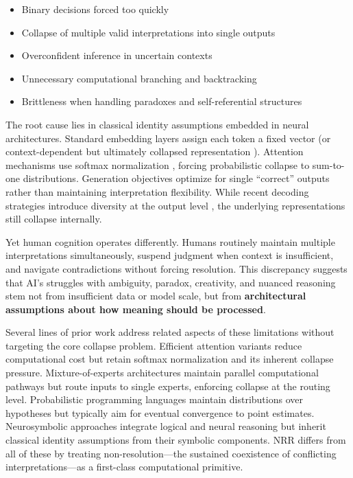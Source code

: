 \documentclass[11pt,a4paper]{article}
\begin{document}
\begin{itemize}
\item Binary decisions forced too quickly
\item Collapse of multiple valid interpretations into single outputs
\item Overconfident inference in uncertain contexts
\item Unnecessary computational branching and backtracking
\item Brittleness when handling paradoxes and self-referential structures
\end{itemize}

The root cause lies in classical identity assumptions embedded in neural architectures.
Standard embedding layers assign each token a fixed vector (or context-dependent but ultimately collapsed representation \cite{peters2018deep}).
Attention mechanisms use softmax normalization \cite{vaswani2017attention}, forcing probabilistic collapse to sum-to-one distributions.
Generation objectives optimize for single ``correct'' outputs rather than maintaining interpretation flexibility.
While recent decoding strategies introduce diversity at the output level \cite{holtzman2020curious, li2023contrastive}, the underlying representations still collapse internally.

Yet human cognition operates differently.
Humans routinely maintain multiple interpretations simultaneously, suspend judgment when context is insufficient, and navigate contradictions without forcing resolution.
This discrepancy suggests that AI's struggles with ambiguity, paradox, creativity, and nuanced reasoning stem not from insufficient data or model scale, but from \textbf{architectural assumptions about how meaning should be processed}.

Several lines of prior work address related aspects of these limitations without targeting the core collapse problem.
Efficient attention variants \cite{child2019generating, dao2022flashattention} reduce computational cost but retain softmax normalization and its inherent collapse pressure.
Mixture-of-experts architectures \cite{shazeer2017outrageously} maintain parallel computational pathways but route inputs to single experts, enforcing collapse at the routing level.
Probabilistic programming languages \cite{goodman2008church} maintain distributions over hypotheses but typically aim for eventual convergence to point estimates.
Neurosymbolic approaches \cite{garcez2020neural} integrate logical and neural reasoning but inherit classical identity assumptions from their symbolic components.
NRR differs from all of these by treating non-resolution---the sustained coexistence of conflicting interpretations---as a first-class computational primitive.
\end{document}
